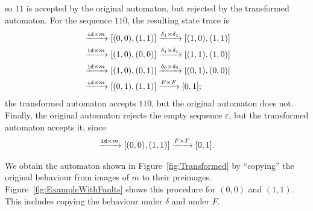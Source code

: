 so $11$ is accepted by the original automaton, but rejected by the transformed automaton. 
For the sequence $110$, the resulting state trace is 
\begin{align*}
    [(0,0),(0,0)]&\xrightarrow{\id\times m}[(0,0),(1,1)]\xrightarrow{\delta_1\times\delta_1}[(1,0),(1,1)]\\
   &\xrightarrow{\id\times m}[(1,0),(0,0)]\xrightarrow{\delta_1\times\delta_1}[(1,1),(1,0)]\\
   &\xrightarrow{\id\times m}[(1,0),(0,1)]\xrightarrow{\delta_0\times\delta_0}[(0,1),(0,0)]\\
   &\xrightarrow{\id\times m}[(0,1),(1,1)]\xrightarrow{F\times F}[0,1];
\end{align*}
the transformed automaton accepts $110$, but the original automaton does not. Finally, the original automaton rejects the empty sequence $\varepsilon$, but the transformed automaton accepts it, since 
\begin{align*}
    [(0,0),(0,0)]\xrightarrow{\id\times m}[(0,0),(1,1)]\xrightarrow{F\times F}[0,1].
\end{align*} 


We obtain the automaton shown in Figure~\ref{fig:Transformed} by ``copying'' the original behaviour from images of $m$ to their preimages. Figure~\ref{fig:ExampleWithFaults} shows this procedure for $(0,0)$ and $(1,1)$. This includes copying the behaviour under $\delta$ and under $F$. 

